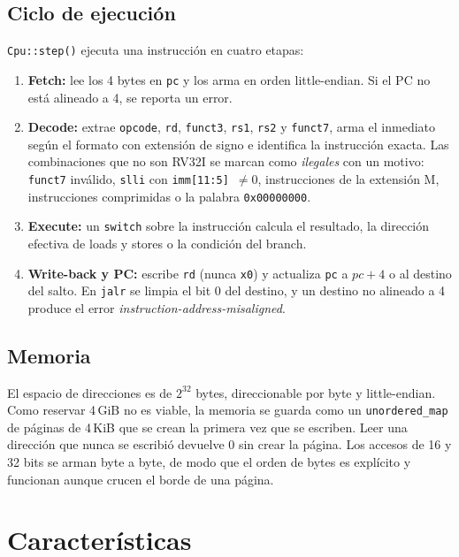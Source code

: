 \documentclass[11pt,a4paper]{article}
\newcommand{\cmd}[1]{\texttt{#1}}
\begin{document}
\subsection{Ciclo de ejecución}
\cmd{Cpu::step()} ejecuta una instrucción en cuatro etapas:
\begin{enumerate}
  \item \textbf{Fetch:} lee los 4 bytes en \cmd{pc} y los arma en orden little-endian. Si el PC no está alineado a
        4, se reporta un error.
  \item \textbf{Decode:} extrae \cmd{opcode}, \cmd{rd}, \cmd{funct3}, \cmd{rs1}, \cmd{rs2} y \cmd{funct7}, arma el
        inmediato según el formato con extensión de signo e identifica la instrucción exacta. Las combinaciones que
        no son RV32I se marcan como \emph{ilegales} con un motivo: \cmd{funct7} inválido, \cmd{slli} con
        \cmd{imm[11:5]}~$\neq 0$, instrucciones de la extensión M, instrucciones comprimidas o la palabra
        \cmd{0x00000000}.
  \item \textbf{Execute:} un \cmd{switch} sobre la instrucción calcula el resultado, la dirección efectiva de
        loads y stores o la condición del branch.
  \item \textbf{Write-back y PC:} escribe \cmd{rd} (nunca \cmd{x0}) y actualiza \cmd{pc} a $pc+4$ o al destino del
        salto. En \cmd{jalr} se limpia el bit 0 del destino, y un destino no alineado a 4 produce el error
        \emph{instruction-address-misaligned}.
\end{enumerate}

\subsection{Memoria}
El espacio de direcciones es de $2^{32}$ bytes, direccionable por byte y little-endian. Como reservar 4\,GiB no es
viable, la memoria se guarda como un \cmd{unordered\_map} de páginas de 4\,KiB que se crean la primera vez que se
escriben. Leer una dirección que nunca se escribió devuelve 0 sin crear la página. Los accesos de 16 y 32 bits se
arman byte a byte, de modo que el orden de bytes es explícito y funcionan aunque crucen el borde de una página.

\section{Características}
\end{document}
